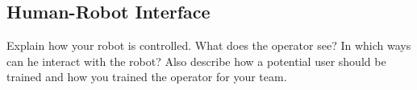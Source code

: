 \subsection{Human-Robot Interface}
Explain how your robot is controlled. What does the operator see? In which ways can he interact with the robot? Also describe how a potential user should be trained and how you trained the operator for your team.